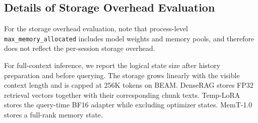 \subsection{Details of Storage Overhead Evaluation}
\label{appendix:eval_storage_overhead}

For the storage overhead evaluation, note that process-level \texttt{max\_memory\_allocated} includes model weights and memory pools, and therefore does not reflect the per-session storage overhead.

For full-context inference, we report the logical state size after history preparation and before querying.
The storage grows linearly with the visible context length and is capped at 256K tokens on BEAM.
DenseRAG stores FP32 retrieval vectors together with their corresponding chunk texts.
Temp-LoRA stores the query-time BF16 adapter while excluding optimizer states.
MemT-1.0 stores a full-rank memory state.